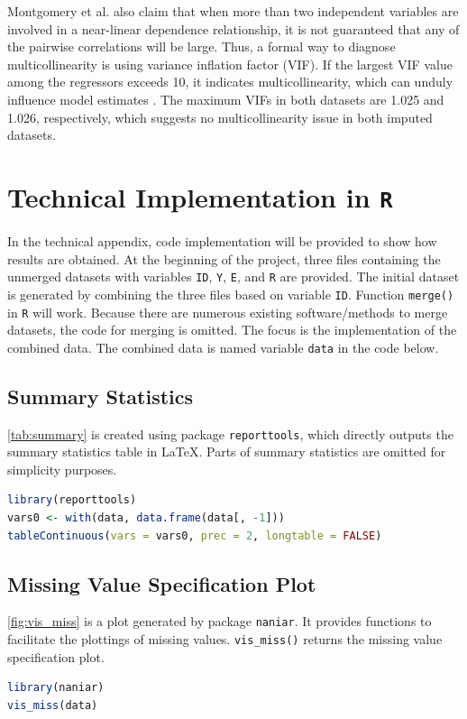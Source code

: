 \documentclass[11pt]{article}
\begin{document}
Montgomery et al. \cite{bk:montgomery} also claim that when more than two independent variables are involved in a near-linear dependence relationship, it is not guaranteed that any of the pairwise correlations will be large. Thus, a formal way to diagnose multicollinearity is using variance inflation factor (VIF). If the largest VIF value among the regressors exceeds 10, it indicates multicollinearity, which can unduly influence model estimates \cite{bk:kutner}. The maximum VIFs in both datasets are 1.025 and 1.026, respectively, which suggests no multicollinearity issue in both imputed datasets.


\appendix
\section{Technical Implementation in \texttt{R}}
In the technical appendix, code implementation will be provided to show how results are obtained. At the beginning of the project, three files containing the unmerged datasets with variables \texttt{ID}, \texttt{Y}, \texttt{E}, and \texttt{R} are provided. The initial dataset is generated by combining the three files based on variable \texttt{ID}. Function \texttt{merge()} in \texttt{R} will work. Because there are numerous existing software/methods to merge datasets, the code for merging is omitted. The focus is the implementation of the combined data. The combined data is named variable \texttt{data} in the code below.

\subsection{Summary Statistics}
\autoref{tab:summary} is created using package \texttt{reporttools}, which directly outputs the summary statistics table in \LaTeX. Parts of summary statistics are omitted for simplicity purposes. 
\begin{file}[project.r]
\begin{lstlisting}[language = R]
library(reporttools)
vars0 <- with(data, data.frame(data[, -1]))
tableContinuous(vars = vars0, prec = 2, longtable = FALSE)
\end{lstlisting}
\end{file}

\subsection{Missing Value Specification Plot}
\autoref{fig:vis_miss} is a plot generated by package \texttt{naniar}. It provides functions to facilitate the plottings of missing values. \texttt{vis\_miss()} returns the missing value specification plot.
\begin{file}[project.r]
\begin{lstlisting}[language = R]
library(naniar)
vis_miss(data)
\end{lstlisting}
\end{file}
\end{document}
